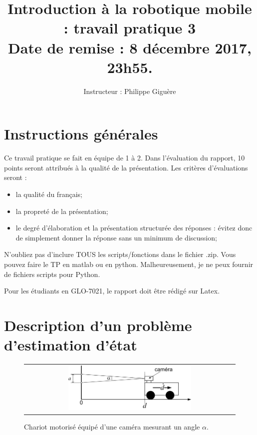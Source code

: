 \documentclass[12pt]{article}
\begin{document}
\title{Introduction à la robotique mobile : travail pratique 3  \\  Date de remise : 8 décembre 2017, 23h55.}
\author{Instructeur : Philippe Giguère}

\maketitle

\section{Instructions générales}
Ce travail pratique se fait en équipe de 1 à 2. Dans l'évaluation du rapport, 10 points seront attribués à la qualité de la présentation. Les critères d'évaluations seront :
\begin{itemize}
\item la qualité du français;
\item la propreté de la présentation;
\item le degré d'élaboration et la présentation structurée des réponses : évitez donc de simplement donner la réponse sans un minimum de discussion;
\end{itemize}
N'oubliez pas d'inclure TOUS les scripts/fonctions dans le fichier .zip. Vous pouvez faire le TP en matlab ou en python. Malheureusement, je ne peux fournir de fichiers scripts pour Python.
\vspace{1in}

Pour les étudiants en GLO-7021, le rapport doit être rédigé sur Latex.

\newpage
\section {Description d'un problème d'estimation d'état}
\label{DescriptionProbleme}

\begin{figure}[ht]
 \begin{center}
  \begin{tabular}{c}
    \includegraphics[width=0.60\textwidth]{ChariotCamera.png}
  \end{tabular}
 \end{center}
 \vspace{-0.3in}
 \caption{Chariot motorisé équipé d'une caméra mesurant un angle $\alpha$.}
 \label{Chariot}
\end{figure}
\end{document}
